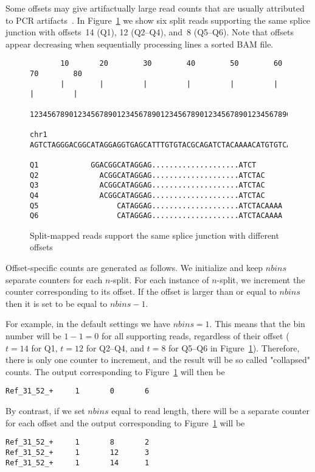 \documentclass{article}
\begin{document}
Some offsets may give artifactually large read counts that are usually attributed to PCR 
artifacts~\cite{pmid22537040}. In Figure~\ref{fig::02} we show six split reads supporting the same splice 
junction with offsets~14 (Q1), 12 (Q2--Q4), and~8 (Q5--Q6). Note that offsets appear decreasing when sequentially 
processing lines a sorted BAM file.
%
\begin{figure}[h]
\footnotesize
\begin{verbatim}
       10       20        30        40        50        60        70        80
       |        |         |         |         |         |         |         |
       123456789012345678901234567890123456789012345678901234567890123456789012

chr1   AGTCTAGGGACGGCATAGGAGGTGAGCATTTGTGTACGCAGATCTACAAAACATGTGTCACGGATAGGATCG

Q1            GGACGGCATAGGAG....................ATCT      
Q2              ACGGCATAGGAG....................ATCTAC    
Q3              ACGGCATAGGAG....................ATCTAC    
Q4              ACGGCATAGGAG....................ATCTAC    
Q5                  CATAGGAG....................ATCTACAAAA
Q6                  CATAGGAG....................ATCTACAAAA
\end{verbatim}
\caption{Split-mapped reads support the same splice junction with different offsets\label{fig::02}}
\end{figure}

Offset-specific counts are generated as follows. We initialize and keep $nbins$ separate counters
for each $n$-split. For each instance of $n$-split, we increment the counter corresponding to its 
offset. If the offset is larger than or equal to $nbins$ then it is  set to be equal to $nbins-1$.

For example, in the default settings we have $nbins=1$. This means that the bin number will be $1-1=0$ 
for all supporting reads, regardless of their offset ($t=14$ for Q1, $t=12$ for Q2--Q4, and $t=8$ for 
Q5--Q6 in Figure~\ref{fig::02}). Therefore, there is only one counter to increment, and the result will 
be so called "collapsed" counts. The output corresponding to Figure~\ref{fig::02} will then be
\begin{verbatim}
Ref_31_52_+     1       0       6
\end{verbatim}

By contrast, if we set $nbins$ equal to read length, there will be a separate counter for each offset 
and the output corresponding to Figure~\ref{fig::02} will be
\begin{verbatim}
Ref_31_52_+     1       8       2
Ref_31_52_+     1       12      3
Ref_31_52_+     1       14      1
\end{verbatim}
\end{document}

